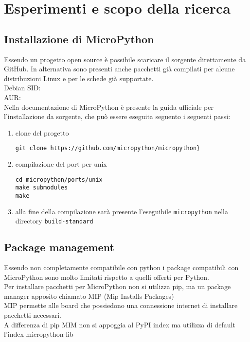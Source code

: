 \documentclass[12pt,a4paper]{report}
\begin{document}
\chapter{Esperimenti e scopo della ricerca}

\section{Installazione di
MicroPython}\label{installazione-di-micropython}

Essendo un progetto open source è possibile scaricare il sorgente
direttamente da GitHub. In alternativa sono presenti anche pacchetti già
compilati per alcune distribuzioni Linux e per le schede già
supportate.\\
Debian SID: \cite{debian_sid} \\
AUR:\cite{aur_arch} \\
Nella documentazione di MicroPython \cite{micropython_getting_started} è presente la guida ufficiale per
l'installazione da sorgente, che può essere eseguita
seguento i seguenti passi:

\begin{enumerate}
\item
  clone del progetto
\begin{verbatim}
git clone https://github.com/micropython/micropython}
\end{verbatim}
\item
  compilazione del port per unix
\begin {verbatim} 
cd micropython/ports/unix
make submodules
make
\end{verbatim}
\end{enumerate}

\begin{enumerate}
\setcounter{enumi}{2}
\item
  alla fine della compilazione sarà presente
  l'eseguibile \texttt{micropython} nella directory
  \texttt{build-standard}
\end{enumerate}

\section{Package management}

Essendo non completamente compatibile con python i package compatibili
con MicroPython sono molto limitati rispetto a quelli offerti per
Python.\\
Per installare pacchetti per MicroPython non si utilizza pip, ma un
package manager apposito chiamato MIP \cite{MIP}
(Mip Installs Packages)\\
MIP permette alle board che possiedono una connessione internet di
installare pacchetti necessari.\\
A differenza di pip MIM non si appoggia al PyPI index ma utilizza di
default l'index micropython-lib \cite{micropython_lib}
\end{document}

